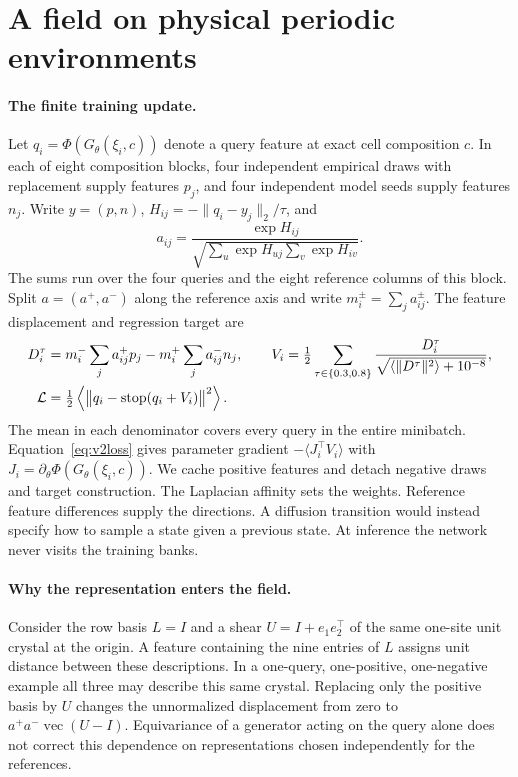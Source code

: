 \section{A field on physical periodic environments}\label{sec:physical-theory}
\paragraph{The finite training update.}
Let $q_i=\Phi(G_\theta(\xi_i,c))$ denote a query feature at exact cell composition $c$.
In each of eight composition blocks, four independent empirical draws with replacement
supply features $p_j$, and four independent model seeds supply features $n_j$.
Write $y=(p,n)$, $H_{ij}=-\|q_i-y_j\|_2/\tau$, and
\[
 a_{ij}=\frac{\exp H_{ij}}{\sqrt{\sum_u\exp H_{uj}\sum_v\exp H_{iv}}}.
\]
The sums run over the four queries and the eight reference columns of this block.
Split $a=(a^+,a^-)$ along the reference axis and write $m_i^\pm=\sum_j a^\pm_{ij}$.
The feature displacement and regression target are
\begin{align}
 D_i^\tau&=m_i^-\sum_j a^+_{ij}p_j-m_i^+\sum_j a^-_{ij}n_j,\qquad
 V_i=\tfrac12\sum_{\tau\in\{0.3,0.8\}}
 \frac{D_i^\tau}{\sqrt{\langle\|D^\tau\|^2\rangle+10^{-8}}},\label{eq:v2field}\\
 {\cal L}&=\tfrac12\left\langle
 \big\|q_i-\operatorname{stop}(q_i+V_i)\big\|^2\right\rangle .\label{eq:v2loss}
\end{align}
The mean in each denominator covers every query in the entire minibatch.
Equation~\eqref{eq:v2loss} gives parameter gradient $-\langle J_i^\top V_i\rangle$
with $J_i=\partial_\theta\Phi(G_\theta(\xi_i,c))$. We cache positive features and detach
negative draws and target construction. The Laplacian affinity
sets the weights. Reference feature differences supply the directions. A diffusion
transition would instead specify how to sample a state given a previous state.
At inference the network never visits the training banks.

\paragraph{Why the representation enters the field.}
Consider the row basis $L=I$ and a shear $U=I+e_1e_2^\top$ of the same one-site
unit crystal at the origin. A feature containing the nine entries of $L$ assigns unit
distance between these descriptions. In a one-query, one-positive, one-negative example
all three may describe this same crystal. Replacing only the positive basis by $U$
changes the unnormalized displacement from zero to
$a^+a^-\operatorname{vec}(U-I)$. Equivariance of a generator acting on the query alone
does not correct this dependence on representations chosen independently for the references.

